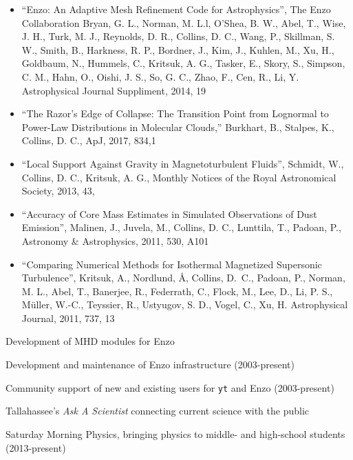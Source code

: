 \documentclass[11pt]{article}
\begin{document}
\begin{itemize}
  \item ``Enzo: An Adaptive Mesh Refinement Code for Astrophysics'', The Enzo
Collaboration 
Bryan, G. L., Norman, M. L.l, O’Shea, B. W.,  Abel, T.,  Wise, J. H.,
Turk, M. J., 
Reynolds, D. R.,
Collins, D. C.,
Wang, P., Skillman, S. W., Smith, B., Harkness, R. P., Bordner, J.,
Kim, J., Kuhlen, M., Xu, H.,
Goldbaum, N., Hummels, C., Kritsuk, A. G., Tasker, E., 
Skory, S., Simpson, C. M., Hahn, O., Oishi, J. S., So, G. C.,
Zhao, F., Cen, R., Li, Y.
Astrophysical Journal Suppliment, 2014,  19

\item ``The Razor’s Edge of Collapse: The Transition Point from Lognormal to Power-Law Distributions in Molecular Clouds,'' 
Burkhart, B., Stalpes, K., Collins, D. C.,
ApJ, 2017, 834,1

\item
``Local Support Against Gravity in Magnetoturbulent Fluids'',
Schmidt, W., Collins, D. C., Kritsuk, A. G.,
Monthly Notices of the Royal Astronomical Society, 2013, 43, 

\item
``Accuracy of Core Mass Estimates in Simulated Observations of Dust Emission'', 
Malinen, J., Juvela, M., Collins, D. C., Lunttila, T., Padoan, P.,
Astronomy \& Astrophysics, 2011, 530, A101

\item
``Comparing Numerical
Methods for Isothermal Magnetized Supersonic Turbulence'', 
Kritsuk, A., Nordlund, \AA, Collins, D.~C., 
Padoan, P., Norman, M. L., Abel, T., Banerjee, R., Federrath, C., Flock, M.,
Lee, D., Li, P. S., M\"uller, W.-C., Teyssier, R., Ustyugov, S. D., Vogel, C.,
Xu, H.
Astrophysical Journal, 2011, 737, 13

\end{itemize}



\medskip
\noindent Development of MHD modules for Enzo

\medskip
\noindent Development and maintenance of Enzo infrastructure (2003-present)

\medskip
\noindent Community support of new and existing users for {\tt yt} and Enzo
(2003-present)

\medskip
\noindent Tallahassee's \emph{Ask A Scientist} connecting current science with the public

\medskip
\noindent Saturday Morning Physics, bringing physics to middle- and high-school
students (2013-present)



%

%
\end{document}
